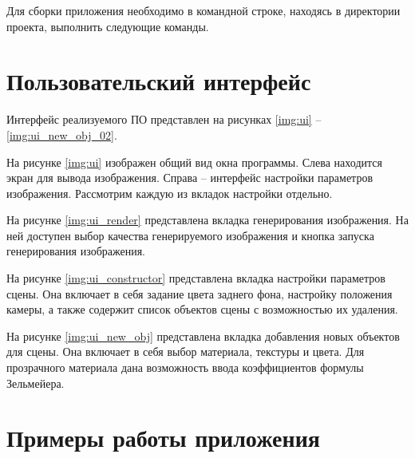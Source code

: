         Для сборки приложения необходимо в командной строке, находясь в директории проекта, выполнить следующие команды.
        

    \section{Пользовательский интерфейс}
    
        Интерфейс реализуемого ПО представлен на рисунках \ref{img:ui} – \ref{img:ui_new_obj_02}.

        
        На рисунке \ref{img:ui} изображен общий вид окна программы. Слева находится экран для вывода изображения. Справа -- интерфейс настройки параметров изображения. Рассмотрим каждую из вкладок настройки отдельно.
        
        
        На рисунке \ref{img:ui_render} представлена вкладка генерирования изображения. На ней доступен выбор качества генерируемого изображения и кнопка запуска генерирования изображения.
        
        
        На рисунке \ref{img:ui_constructor} представлена вкладка настройки параметров сцены. Она включает в себя задание цвета заднего фона, настройку положения камеры, а также содержит список объектов сцены с возможностью их удаления.
        
        
        На рисунке \ref{img:ui_new_obj} представлена вкладка добавления новых объектов для сцены. Она включает в себя выбор материала, текстуры и цвета. Для прозрачного материала дана возможность ввода коэффициентов формулы Зельмейера.
    
    \clearpage
        
    \section{Примеры работы приложения}
    
